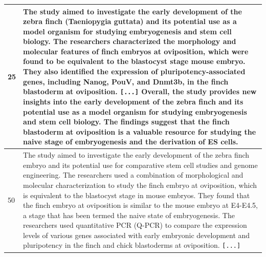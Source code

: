 \begin{table}[]
\begin{tabular}{l|p{}}
25 & The study aimed to investigate the early development of the zebra finch (Taeniopygia guttata) and its potential use as a model organism for studying embryogenesis and stem cell biology. The researchers characterized the morphology and molecular features of finch embryos at oviposition, which were found to be equivalent to the blastocyst stage mouse embryo. They also identified the expression of pluripotency-associated genes, including Nanog, PouV, and Dnmt3b, in the finch blastoderm at oviposition.  \texttt{[...]}
Overall, the study provides new insights into the early development of the zebra finch and its potential use as a model organism for studying embryogenesis and stem cell biology. The findings suggest that the finch blastoderm at oviposition is a valuable resource for studying the naive stage of embryogenesis and the derivation of ES cells. \\ \hline
50 & The study aimed to investigate the early development of the zebra finch embryo and its potential use for comparative stem cell studies and genome engineering. The researchers used a combination of morphological and molecular characterization to study the finch embryo at oviposition, which is equivalent to the blastocyst stage in mouse embryos. They found that the finch embryo at oviposition is similar to the mouse embryo at E4-E4.5, a stage that has been termed the naive state of embryogenesis.  The researchers used quantitative PCR (Q-PCR) to compare the expression levels of various genes associated with early embryonic development and pluripotency in the finch and chick blastoderms at oviposition. \texttt{[...]}

\end{tabular}
\end{table}
